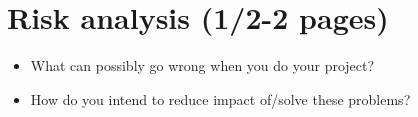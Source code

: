 \chapter{Risk analysis (1/2-2 pages)}
\begin{itemize}
\item What can possibly go wrong when you do your project?
\item How do you intend to reduce impact of/solve these problems?
\end{itemize}